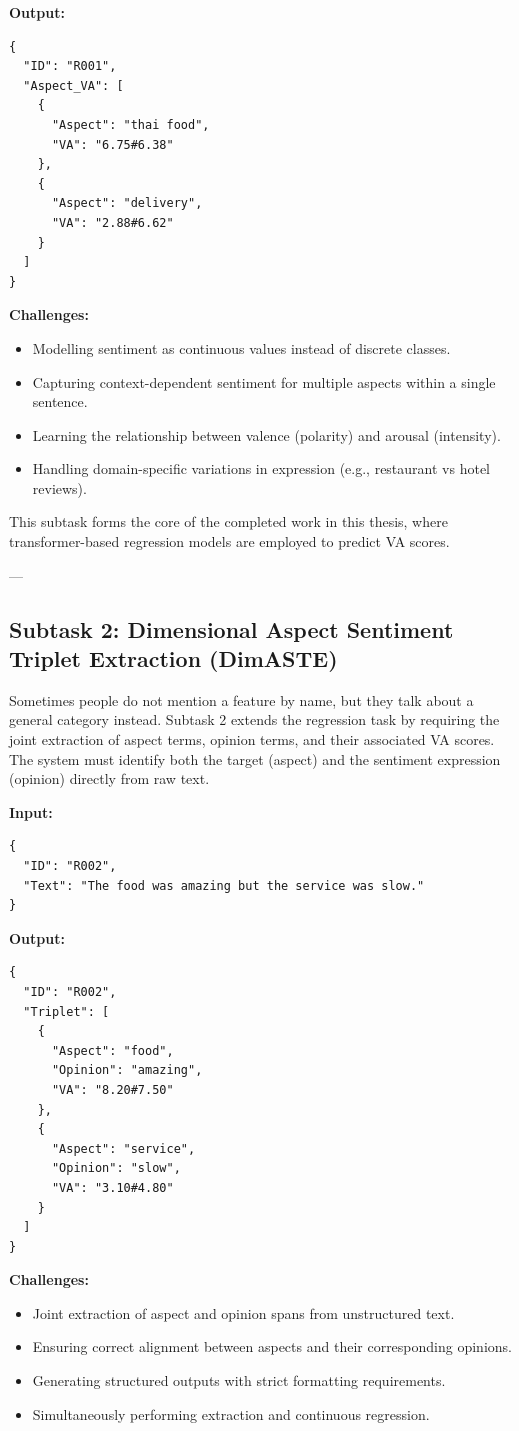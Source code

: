 \documentclass{article}
\begin{document}
\textbf{Output:}
\begin{verbatim}
{
  "ID": "R001",
  "Aspect_VA": [
    {
      "Aspect": "thai food",
      "VA": "6.75#6.38"
    },
    {
      "Aspect": "delivery",
      "VA": "2.88#6.62"
    }
  ]
}
\end{verbatim}

\textbf{Challenges:}
\begin{itemize}
    \item Modelling sentiment as continuous values instead of discrete classes.
    \item Capturing context-dependent sentiment for multiple aspects within a single sentence.
    \item Learning the relationship between valence (polarity) and arousal (intensity).
    \item Handling domain-specific variations in expression (e.g., restaurant vs hotel reviews).
\end{itemize}

This subtask forms the core of the completed work in this thesis, where transformer-based regression models are employed to predict VA scores.

---

\subsection{Subtask 2: Dimensional Aspect Sentiment Triplet Extraction (DimASTE)}

Sometimes people do not mention a feature by name, but they talk about a general category instead. Subtask 2 extends the regression task by requiring the joint extraction of aspect terms, opinion terms, and their associated VA scores. The system must identify both the target (aspect) and the sentiment expression (opinion) directly from raw text.

\textbf{Input:}
\begin{verbatim}
{
  "ID": "R002",
  "Text": "The food was amazing but the service was slow."
}
\end{verbatim}

\textbf{Output:}
\begin{verbatim}
{
  "ID": "R002",
  "Triplet": [
    {
      "Aspect": "food",
      "Opinion": "amazing",
      "VA": "8.20#7.50"
    },
    {
      "Aspect": "service",
      "Opinion": "slow",
      "VA": "3.10#4.80"
    }
  ]
}
\end{verbatim}

\textbf{Challenges:}
\begin{itemize}
    \item Joint extraction of aspect and opinion spans from unstructured text.
    \item Ensuring correct alignment between aspects and their corresponding opinions.
    \item Generating structured outputs with strict formatting requirements.
    \item Simultaneously performing extraction and continuous regression.
\end{itemize}
\end{document}
